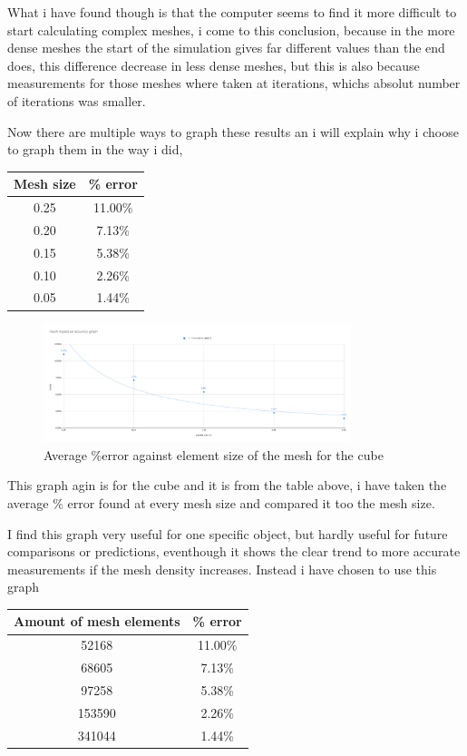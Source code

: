 \documentclass[12pt,a4paper]{article}
\begin{document}
What i have found though is that the computer seems to find it more difficult to start calculating complex meshes, i come to this conclusion, because in the more dense meshes the start of the simulation gives far different values than the end does, this difference decrease in less dense meshes, but this is also because measurements for those meshes where taken at iterations, whichs absolut number of iterations was smaller.

Now there are multiple ways to graph these results an i will explain why i choose to graph them in the way i did, 

\begin{table}[H]
\centering
\begin{tabular}{|c|c|}
\hline
\textbf{Mesh size} & \textbf{\% error} \\
\hline
0.25 & 11.00\% \\
\hline
0.20 & 7.13\% \\
\hline
0.15 & 5.38\% \\
\hline
0.10 & 2.26\% \\
\hline
0.05 & 1.44\% \\
\hline
\end{tabular}
\end{table}

\begin{figure}[H]
\centering
\includegraphics[width=0.8\textwidth]{image22.png}
\caption{Average \%error against element size of the mesh for the cube}
\end{figure}

This graph agin is for the cube and it is from the table above, i have taken the average \% error found at every mesh size and compared it too the mesh size.

I find this graph very useful for one specific object, but hardly useful for future comparisons or predictions, eventhough it shows the clear trend to more accurate measurements if the mesh density increases. Instead i have chosen to use this graph

\begin{table}[H]
\centering
\begin{tabular}{|c|c|}
\hline
\textbf{Amount of mesh elements} & \textbf{\% error} \\
\hline
52168 & 11.00\% \\
\hline
68605 & 7.13\% \\
\hline
97258 & 5.38\% \\
\hline
153590 & 2.26\% \\
\hline
341044 & 1.44\% \\
\hline
\end{tabular}
\end{table}
\end{document}
